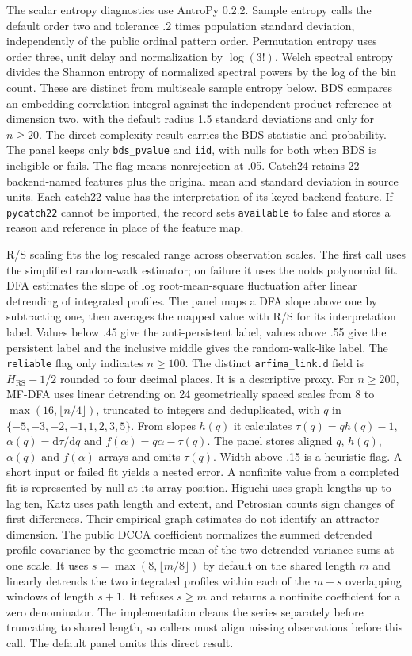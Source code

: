 The scalar entropy diagnostics use AntroPy 0.2.2. Sample entropy calls the default order two and tolerance .2 times population standard deviation, independently of the public ordinal pattern order. Permutation entropy uses order three, unit delay and normalization by $\log(3!)$. Welch spectral entropy divides the Shannon entropy of normalized spectral powers by the log of the bin count. These are distinct from multiscale sample entropy below. BDS compares an embedding correlation integral against the independent-product reference at dimension two, with the default radius 1.5 standard deviations and only for $n\ge20$. The direct complexity result carries the BDS statistic and probability. The panel keeps only \texttt{bds\_pvalue} and \texttt{iid}, with nulls for both when BDS is ineligible or fails. The flag means nonrejection at .05. Catch24 retains 22 backend-named features plus the original mean and standard deviation in source units. Each catch22 value has the interpretation of its keyed backend feature. If \texttt{pycatch22} cannot be imported, the record sets \texttt{available} to false and stores a reason and reference in place of the feature map.

R/S scaling fits the log rescaled range across observation scales. The first call uses the simplified random-walk estimator; on failure it uses the nolds polynomial fit. DFA estimates the slope of log root-mean-square fluctuation after linear detrending of integrated profiles. The panel maps a DFA slope above one by subtracting one, then averages the mapped value with R/S for its interpretation label. Values below .45 give the anti-persistent label, values above .55 give the persistent label and the inclusive middle gives the random-walk-like label. The \texttt{reliable} flag only indicates $n\ge100$. The distinct \texttt{arfima\_link.d} field is $H_{\mathrm{RS}}-1/2$ rounded to four decimal places. It is a descriptive proxy. For $n\ge200$, MF-DFA uses linear detrending on 24 geometrically spaced scales from 8 to $\max(16,\lfloor n/4\rfloor)$, truncated to integers and deduplicated, with $q$ in $\{-5,-3,-2,-1,1,2,3,5\}$. From slopes $h(q)$ it calculates $\tau(q)=qh(q)-1$, $\alpha(q)=\mathrm{d}\tau/\mathrm{d}q$ and $f(\alpha)=q\alpha-\tau(q)$. The panel stores aligned $q$, $h(q)$, $\alpha(q)$ and $f(\alpha)$ arrays and omits $\tau(q)$. Width above .15 is a heuristic flag. A short input or failed fit yields a nested error. A nonfinite value from a completed fit is represented by null at its array position. Higuchi uses graph lengths up to lag ten, Katz uses path length and extent, and Petrosian counts sign changes of first differences. Their empirical graph estimates do not identify an attractor dimension. The public DCCA coefficient normalizes the summed detrended profile covariance by the geometric mean of the two detrended variance sums at one scale. It uses $s=\max(8,\lfloor m/8\rfloor)$ by default on the shared length $m$ and linearly detrends the two integrated profiles within each of the $m-s$ overlapping windows of length $s+1$. It refuses $s\ge m$ and returns a nonfinite coefficient for a zero denominator. The implementation cleans the series separately before truncating to shared length, so callers must align missing observations before this call. The default panel omits this direct result.

